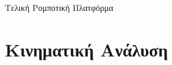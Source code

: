 \documentclass[10pt, compress, handout]{beamer} %
\begin{document}
\begin{frame}{Τελική Ρομποτική Πλατφόρμα}
	\begin{center}
	\end{center}
\end{frame}

\section{Κινηματική Ανάλυση}
\end{document}
